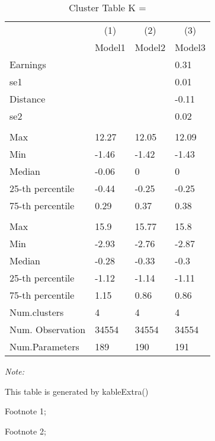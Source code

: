 \begin{table}
\centering
\caption{Cluster Table K = }
\centering
\begin{threeparttable}
\begin{tabular}[t]{llll}
\toprule
\multicolumn{1}{c}{ } & \multicolumn{1}{c}{(1)} & \multicolumn{1}{c}{(2)} & \multicolumn{1}{c}{(3)} \\
\cmidrule(l{3pt}r{3pt}){2-2} \cmidrule(l{3pt}r{3pt}){3-3} \cmidrule(l{3pt}r{3pt}){4-4}
 & Model1 & Model2 & Model3\\
\midrule
Earnings &  &  & 0.31\\
se1 &  &  & 0.01\\
Distance &  &  & -0.11\\
se2 &  &  & 0.02\\
\addlinespace[0.3em]
\multicolumn{4}{l}{\textit{\textbf{Panel A: }}}\\
\hspace{1em}Max & 12.27 & 12.05 & 12.09\\
\hspace{1em}Min & -1.46 & -1.42 & -1.43\\
\hspace{1em}Median & -0.06 & 0 & 0\\
\hspace{1em}25-th percentile & -0.44 & -0.25 & -0.25\\
\hspace{1em}75-th percentile & 0.29 & 0.37 & 0.38\\
\addlinespace[0.3em]
\multicolumn{4}{l}{\textit{\textbf{Panel B: }}}\\
\hspace{1em}Max & 15.9 & 15.77 & 15.8\\
\hspace{1em}Min & -2.93 & -2.76 & -2.87\\
\hspace{1em}Median & -0.28 & -0.33 & -0.3\\
\hspace{1em}25-th percentile & -1.12 & -1.14 & -1.11\\
\hspace{1em}75-th percentile & 1.15 & 0.86 & 0.86\\
Num.clusters & 4 & 4 & 4\\
Num. Observation & 34554 & 34554 & 34554\\
Num.Parameters & 189 & 190 & 191\\
\bottomrule
\end{tabular}
\begin{tablenotes}
\item \textit{Note: } 
\item This table is generated by kableExtra()
\item[1] Footnote 1; 
\item[2] Footnote 2; 
\end{tablenotes}
\end{threeparttable}
\end{table}
